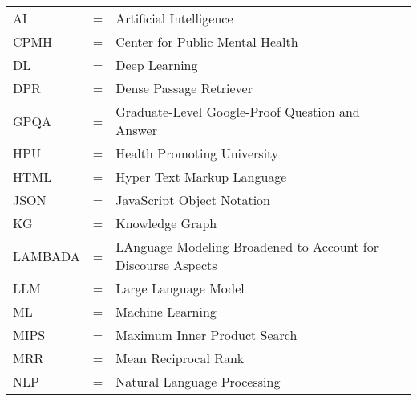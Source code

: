 \begin{tabular}{llp{3in}}
	AI      & \hspace{1.5cm} = & Artificial Intelligence                                      \\
	CPMH    & \hspace{1.5cm} = & Center for Public Mental Health                              \\
	DL      & \hspace{1.5cm} = & Deep Learning                                                \\
	DPR     & \hspace{1.5cm} = & Dense Passage Retriever                                      \\
	GPQA    & \hspace{1.5cm} = & Graduate-Level Google-Proof Question and Answer              \\
	HPU     & \hspace{1.5cm} = & Health Promoting University                                  \\
	HTML    & \hspace{1.5cm} = & Hyper Text Markup Language                                   \\
	JSON    & \hspace{1.5cm} = & JavaScript Object Notation                                   \\
	KG      & \hspace{1.5cm} = & Knowledge Graph                                              \\
	LAMBADA & \hspace{1.5cm} = & LAnguage Modeling Broadened to Account for Discourse Aspects \\
	LLM     & \hspace{1.5cm} = & Large Language Model                                         \\
	ML      & \hspace{1.5cm} = & Machine Learning                                             \\
	MIPS    & \hspace{1.5cm} = & Maximum Inner Product Search                                 \\
	MRR     & \hspace{1.5cm} = & Mean Reciprocal Rank                                         \\
	NLP     & \hspace{1.5cm} = & Natural Language Processing                                  \\

\end{tabular}
